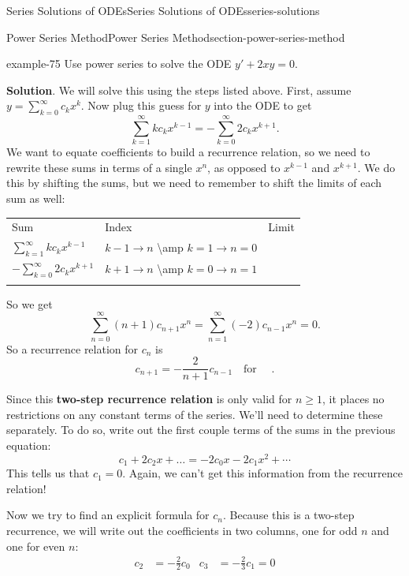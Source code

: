 \documentclass[oneside,10pt,]{book}
\newcommand{\terminology}[1]{\textbf{#1}}
\numberwithin{equation}{section}
\newcommand{\hrulethick} {\noalign{\hrule height 0.11em}}
\newcommand{\qq}[1]{\quad\text{#1}\quad}
\newcommand{\amp}{&}
\begin{document}
\begin{chapterptx}{Series Solutions of ODEs}{}{Series Solutions of ODEs}{}{}{series-solutions}
\begin{sectionptx}{Power Series Method}{}{Power Series Method}{}{}{section-power-series-method}
\begin{example}{}{example-75}
Use power series to solve the ODE \(y'+2xy=0\).%
\par\smallskip%
\noindent\textbf{Solution}.\hypertarget{solution-72}{}\quad%
\hypertarget{p-453}{}%
We will solve this using the steps listed above. First, assume \(y = \sum_{k=0}^{\infty}c_{k}x^{k}\). Now plug this guess for \(y\) into the ODE to get%
\begin{equation*}
\sum_{k=1}^{\infty}kc_{k}x^{k-1} = -\sum_{k=0}^{\infty}2c_{k}x^{k+1}.
\end{equation*}
We want to equate coefficients to build a recurrence relation, so we need to rewrite these sums in terms of a single \(x^{n}\), as opposed to \(x^{k-1}\) and \(x^{k+1}\). We do this by shifting the sums, but we need to remember to shift the limits of each sum as well:%
\begin{tabular}{lll}\hrulethick
Sum&Index&Limit\tabularnewline\hrulethick
\(\sum_{k=1}^{\infty}kc_{k}x^{k-1}\)&\(k-1\to n\) \textbackslash{}amp \(k=1\to n=0\)\tabularnewline[0pt]
\(-\sum_{k=0}^{\infty}2c_{k}x^{k+1}\)&\(k+1\to n\) \textbackslash{}amp \(k=0\to n=1\)\tabularnewline\hrulethick
\end{tabular}
\hypertarget{p-454}{}%
So we get%
\begin{equation*}
\sum_{n=0}^{\infty}(n+1)c_{n+1}x^{n} = \sum_{n=1}^{\infty}(-2)c_{n-1}x^{n} = 0.
\end{equation*}
So a recurrence relation for \(c_{n}\) is%
\begin{equation*}
c_{n+1} = -\frac{2}{n+1}c_{n-1}\qq{for }.
\end{equation*}
%
\par
\hypertarget{p-455}{}%
Since this \terminology{two-step recurrence relation} is only valid for \(n\geq1\), it places no restrictions on any constant terms of the series. We'll need to determine these separately. To do so, write out the first couple terms of the sums in the previous equation:%
\begin{equation*}
c_{1}+2c_{2}x+\dots = -2c_{0}x -2c_{1}x^{2}+\cdots
\end{equation*}
This tells us that \(c_{1} = 0\). Again, we can't get this information from the recurrence relation!%
\par
\hypertarget{p-456}{}%
Now we try to find an explicit formula for \(c_{n}\). Because this is a two-step recurrence, we will write out the coefficients in two columns, one for odd \(n\) and one for even \(n\):%
\begin{align*}
c_{2} \amp= -\frac{2}{2}c_{0} \amp c_{3} \amp= -\frac{2}{3}c_{1} = 0\\

\end{align*}
\end{example}
\end{sectionptx}
\end{chapterptx}
\end{document}
